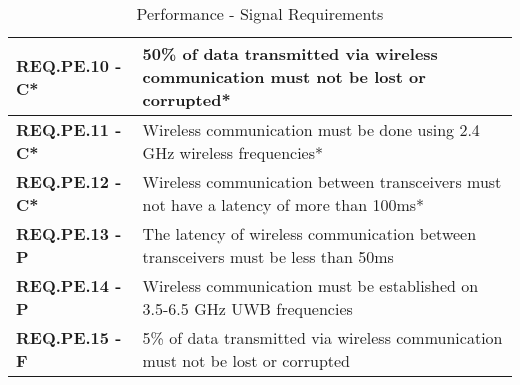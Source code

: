 \bgroup
\def\arraystretch{1.5}
\begin{table}[H]
\centering
\begin{tabular}{ | m{3.5cm} | m{12.5cm} |} 
\hline
 \textbf{REQ.PE.10 - C*} & 50\% of data transmitted via wireless communication must not be lost or corrupted* \\
\hline
 \textbf{REQ.PE.11 - C*} & Wireless communication must be done using 2.4 GHz wireless frequencies* \\
\hline
 \textbf{REQ.PE.12 - C*} & Wireless communication between transceivers must not have a latency of more than 100ms* \\
\hline
 \textbf{REQ.PE.13 - P} & The latency of wireless communication between transceivers must be less than 50ms \\
\hline
 \textbf{REQ.PE.14 - P} & Wireless communication must be established on 3.5-6.5 GHz UWB frequencies \\
\hline
 \textbf{REQ.PE.15 - F} & 5\% of data transmitted via wireless communication must not be lost or corrupted \\

\hline
\end{tabular}
\caption{Performance - Signal Requirements }
\end{table}	
